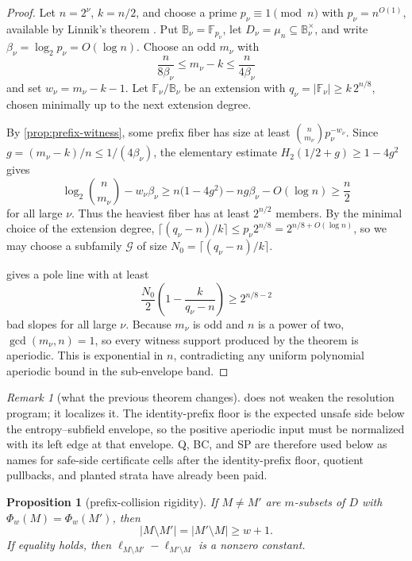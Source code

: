 \documentclass[a4paper,11pt]{amsart}
\newtheorem{proposition}[theorem]{Proposition}
\theoremstyle{remark}
\newtheorem{remark}[theorem]{Remark}
\newcommand{\F}{\mathbb F}
\newcommand{\B}{\mathbb B}
\begin{document}
\begin{proof}
Let \(n=2^\nu\), \(k=n/2\), and choose a prime \(p_\nu\equiv1\pmod n\) with \(p_\nu=n^{O(1)}\), available by Linnik's theorem \cite{Linnik44}.  Put \(\B_\nu=\F_{p_\nu}\), let \(D_\nu=\mu_n\subseteq\B_\nu^\times\), and write \(\beta_\nu=\log_2p_\nu=O(\log n)\).  Choose an odd \(m_\nu\) with
\[
        \frac{n}{8\beta_\nu}\le m_\nu-k\le \frac{n}{4\beta_\nu}
\]
and set \(w_\nu=m_\nu-k-1\).  Let \(\F_\nu/\B_\nu\) be an extension with \(q_\nu=|\F_\nu|\ge k\,2^{n/8}\), chosen minimally up to the next extension degree.

By \cref{prop:prefix-witness}, some prefix fiber has size at least \(\binom n{m_\nu}p_\nu^{-w_\nu}\).  Since \(g=(m_\nu-k)/n\le1/(4\beta_\nu)\), the elementary estimate \(H_2(1/2+g)\ge1-4g^2\) gives
\[
        \log_2\binom n{m_\nu}-w_\nu\beta_\nu
        \ge n\bigl(1-4g^2\bigr)-ng\beta_\nu-O(\log n)
        \ge \frac{n}{2}
\]
for all large \(\nu\).  Thus the heaviest fiber has at least \(2^{n/2}\) members.  By the minimal choice of the extension degree, \(\lceil(q_\nu-n)/k\rceil\le p_\nu 2^{n/8}=2^{n/8+O(\log n)}\), so we may choose a subfamily \(\mathcal G\) of size \(N_0=\lceil(q_\nu-n)/k\rceil\).

 gives a pole line with at least
\[
        \frac{N_0}{2}\left(1-\frac{k}{q_\nu-n}\right)\ge 2^{n/8-2}
\]
bad slopes for all large \(\nu\).  Because \(m_\nu\) is odd and \(n\) is a power of two, \(\gcd(m_\nu,n)=1\), so every witness support produced by the theorem is aperiodic.  This is exponential in \(n\), contradicting any uniform polynomial aperiodic bound in the sub-envelope band.
\end{proof}

\begin{remark}[what the previous theorem changes]\label{rem:normalized-band}
 does not weaken the resolution program; it localizes it.  The identity-prefix floor is the expected unsafe side below the entropy--subfield envelope, so the positive aperiodic input must be normalized with its left edge at that envelope.  Q, BC, and SP are therefore used below as names for safe-side certificate cells after the identity-prefix floor, quotient pullbacks, and planted strata have already been paid.
\end{remark}

\begin{proposition}[prefix-collision rigidity]\label{prop:prefix-rigidity}
If \(M\ne M'\) are \(m\)-subsets of \(D\) with \(\Phi_w(M)=\Phi_w(M')\), then
\[
        |M\setminus M'|=|M'\setminus M|\ge w+1.
\]
If equality holds, then \(\ell_{M\setminus M'}-\ell_{M'\setminus M}\) is a nonzero constant.
\end{proposition}
\end{document}
